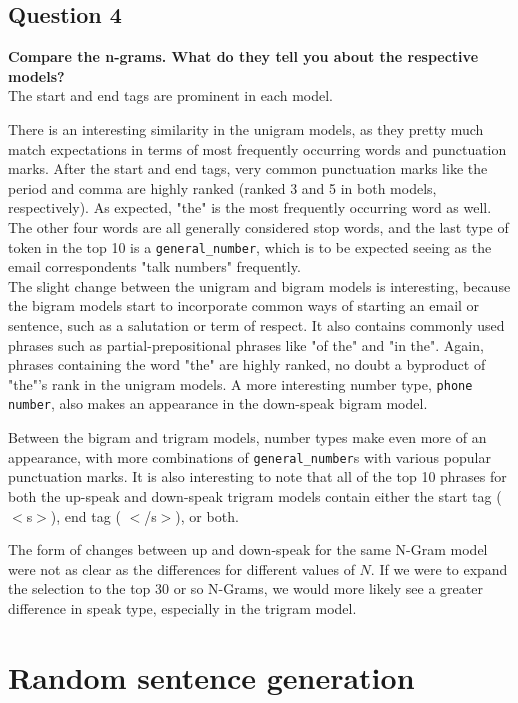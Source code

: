 \documentclass{article} %
\begin{document}
\subsection*{Question 4}

\textbf{Compare the n-grams. What do they tell you about the respective
models?}
\\

The start and end tags are prominent in each model.

There is an interesting similarity in the unigram models, as they pretty much match expectations in terms of most frequently occurring words and punctuation marks. After the start and end tags, very common punctuation marks like the period and comma are highly ranked (ranked 3 and 5 in both models, respectively). As expected, "the" is the most frequently occurring word as well. The other four words are all generally considered stop words, and the last type of  token in the top 10 is a \texttt{general\_number}, which is to be expected seeing as the email correspondents "talk numbers" frequently.\\

The slight change between the unigram and bigram models is interesting, because the bigram models start to incorporate common ways of starting an email or sentence, such as a salutation or term of respect. It also contains commonly used phrases such as partial-prepositional phrases like "of the" and "in the". Again, phrases containing the word "the" are highly ranked, no doubt a byproduct of "the"'s rank in the unigram models. A more interesting number type, \texttt{phone number}, also makes an appearance in the down-speak bigram model.

Between the bigram and trigram models, number types make even more of an appearance, with more combinations of \texttt{general\_number}s with various popular punctuation marks. It is also interesting to note that all of the top 10 phrases for both the up-speak and down-speak trigram models contain either the start tag ($<$s$>$), end tag ( $<$/s$>$), or both.

The form of changes between up and down-speak for the same N-Gram model were not as clear as the differences for different values of $N$. If we were to expand the selection to the top 30 or so N-Grams, we would more likely see a greater difference in speak type, especially in the trigram model.

\section{Random sentence generation}
\end{document}

